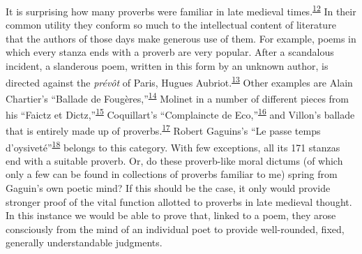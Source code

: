 It is surprising how many proverbs were familiar in late medieval
times.\textsuperscript{\protect\hypertarget{18_Chapter_Eleven__THE_FORMS_OF_THO.xhtmlux5cux23id_608}{\protect\hyperlink{23_NOTES.xhtmlux5cux23id_609}{12}}}
In their common utility they conform so much to the intellectual content
of literature that the authors of those days make generous use of them.
For example, poems in which every stanza ends with a proverb are very
popular. After a scandalous incident, a slanderous poem, written in this
form by an unknown author, is directed against the \emph{prévôt} of
Paris, Hugues
Aubriot.\textsuperscript{\protect\hypertarget{18_Chapter_Eleven__THE_FORMS_OF_THO.xhtmlux5cux23id_606}{\protect\hyperlink{23_NOTES.xhtmlux5cux23id_607}{13}}}
Other examples are Alain Chartier's ``Ballade de
Fougères,''\textsuperscript{\protect\hypertarget{18_Chapter_Eleven__THE_FORMS_OF_THO.xhtmlux5cux23id_604}{\protect\hyperlink{23_NOTES.xhtmlux5cux23id_605}{14}}}
Molinet in a number of different pieces from his ``Faictz et
Dictz,''\textsuperscript{\protect\hypertarget{18_Chapter_Eleven__THE_FORMS_OF_THO.xhtmlux5cux23id_602}{\protect\hyperlink{23_NOTES.xhtmlux5cux23id_603}{15}}}
Coquillart's ``Complaincte de
Eco,''\textsuperscript{\protect\hypertarget{18_Chapter_Eleven__THE_FORMS_OF_THO.xhtmlux5cux23id_600}{\protect\hyperlink{23_NOTES.xhtmlux5cux23id_601}{16}}}
and Villon's ballade that is entirely made up of
proverbs.\textsuperscript{\protect\hypertarget{18_Chapter_Eleven__THE_FORMS_OF_THO.xhtmlux5cux23id_598}{\protect\hyperlink{23_NOTES.xhtmlux5cux23id_599}{17}}}
Robert Gaguins's ``Le passe temps
d'oysiveté''\textsuperscript{\protect\hypertarget{18_Chapter_Eleven__THE_FORMS_OF_THO.xhtmlux5cux23id_596}{\protect\hyperlink{23_NOTES.xhtmlux5cux23id_597}{18}}}
belongs to this category. With few exceptions, all its 171 stanzas end
with a suitable proverb. Or, do these proverb-like moral dictums (of
which only a few can be found in collections of proverbs familiar to me)
spring from Gaguin's own poetic mind? If this should be the case, it
only would provide stronger proof of the vital function allotted to
proverbs in late medieval thought. In this instance we would be able to
prove that, linked to a poem, they arose consciously from the mind of an
individual poet to provide well-rounded, fixed, generally understandable
judgments.

